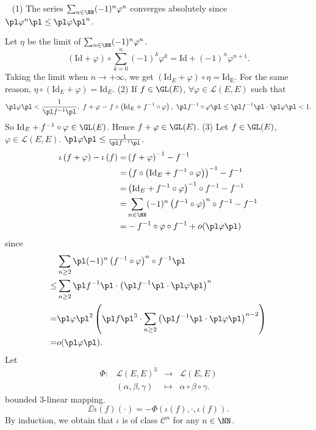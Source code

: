 \begin{proofenv}
    \ \newline
    (1) The series $\sum_{n\in\NN}(-1)^{n}\varphi^{n}$ converges absolutely since $\pl \varphi^n\pl\le \pl \varphi\pl ^n$. 

    Let $\eta$ be the limit of $\sum_{n\in\NN} (-1)^n\varphi^n$. 
    $$ \left(\mathrm{Id}+\varphi\right)\circ \sum_{k=0}^{n}(-1)^k\varphi^k=\mathrm{Id}+(-1)^n\varphi ^{n+1}.$$
    Taking the limit when $n\rightarrow +\infty$, we get $\left(\mathrm{Id}_E+\varphi\right)\circ \eta=\mathrm{Id_E}$. For the same reason, $\eta \circ\left(\mathrm{Id}_E+\varphi\right)=\mathrm{Id}_E$.
    \newline
    (2) If $f\in \GL (E)$, $\forall \varphi\in \mathscr{L}(E,E)$ such that 
    $$\pl \varphi\pl<\frac{1}{\pl f^{-1}\pl},\ f+\varphi=f\circ\left(\mathrm{Id}_E+f^{-1}\circ \varphi\right),\ \pl f^{-1}\circ \varphi\pl \le \pl f^{-1}\pl \cdot\pl \varphi\pl <1.$$
    So $\mathrm{Id}_E+f^{-1}\circ \varphi\in \GL(E)$. Hence $f+\varphi\in \GL(E)$.
    \newline
    (3) Let $f\in \GL(E)$, $\varphi\in \mathscr{L}(E,E)$. $\pl \varphi\pl\le \frac{1}{\pl f^{-1}\pl }$.
    \begin{align*}
        \iota\left(f+\varphi\right)-\iota\left(f\right)=&\left(f+\varphi\right)^{-1}-f^{-1}\\
        =& \left(f\circ\left(\mathrm{Id}_E+f^{-1}\circ\varphi\right)\right)^{-1}-f^{-1}\\
        =& \left(\mathrm{Id}_E+f^{-1}\circ\varphi\right)^{-1}\circ f^{-1}-f^{-1}\\
        =&\sum_{n\in\NN} (-1)^n \left(f^{-1}\circ \varphi\right)^n\circ f^{-1}-f^{-1}\\
        =& -f^{-1}\circ\varphi\circ f^{-1}+o(\pl \varphi\pl)
    \end{align*}
    since 
    \begin{align*}
        &\sum_{n\ge 2}\pl (-1)^n\left(f^{-1}\circ\varphi\right)^n \circ f^{-1}\pl\\
        \le & \sum_{n\ge 2}\pl f^{-1}\pl \cdot \left(\pl f^{-1}\pl\cdot\pl \varphi\pl\right) ^n\\
        =& \pl \varphi\pl ^2 \left( \pl f\pl^3 \cdot\sum_{n\ge 2} \left(\pl f^{-1}\pl \cdot\pl \varphi\pl\right)^{n-2}\right)\\
        =&o(\pl \varphi\pl ).
    \end{align*}
    Let
    $$\begin{array}{rrcl}
        \Phi:& \mathscr{L}(E,E)^3&\longrightarrow& \mathscr{L}(E,E)\\
        & (\alpha,\beta, \gamma)&\longmapsto& \alpha\circ\beta\circ\gamma.
    \end{array}$$
    bounded $3$-linear mapping. 
    $$ \DD \iota(f)(\cdot)=-\Phi \left(\iota(f), \cdot, \iota(f)\right).$$
    By induction, we obtain that $\iota$ is of class $\mathcal{C}^n$ for any $n\in \NN$.
\end{proofenv}


